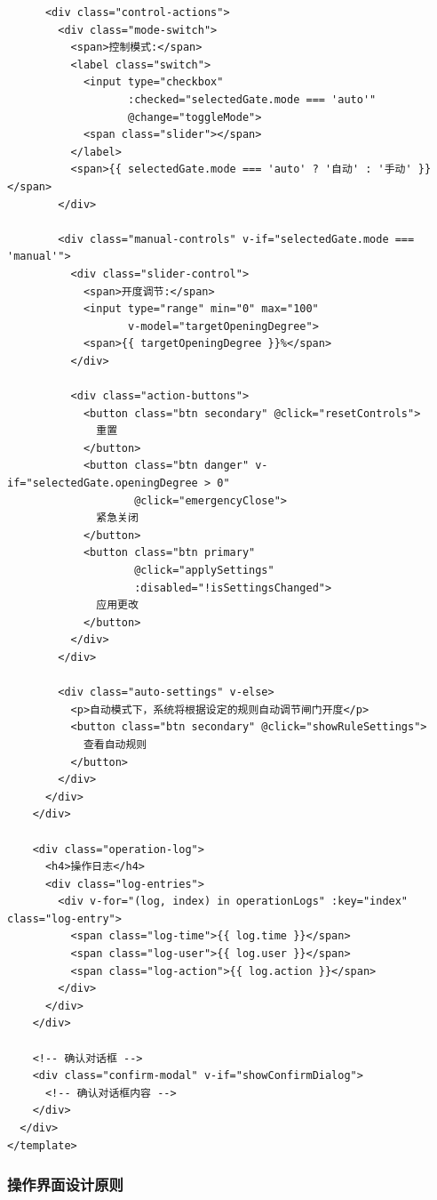 \begin{lstlisting}
      <div class="control-actions">
        <div class="mode-switch">
          <span>控制模式:</span>
          <label class="switch">
            <input type="checkbox" 
                   :checked="selectedGate.mode === 'auto'"
                   @change="toggleMode">
            <span class="slider"></span>
          </label>
          <span>{{ selectedGate.mode === 'auto' ? '自动' : '手动' }}</span>
        </div>
        
        <div class="manual-controls" v-if="selectedGate.mode === 'manual'">
          <div class="slider-control">
            <span>开度调节:</span>
            <input type="range" min="0" max="100" 
                   v-model="targetOpeningDegree">
            <span>{{ targetOpeningDegree }}%</span>
          </div>
          
          <div class="action-buttons">
            <button class="btn secondary" @click="resetControls">
              重置
            </button>
            <button class="btn danger" v-if="selectedGate.openingDegree > 0" 
                    @click="emergencyClose">
              紧急关闭
            </button>
            <button class="btn primary" 
                    @click="applySettings"
                    :disabled="!isSettingsChanged">
              应用更改
            </button>
          </div>
        </div>
        
        <div class="auto-settings" v-else>
          <p>自动模式下，系统将根据设定的规则自动调节闸门开度</p>
          <button class="btn secondary" @click="showRuleSettings">
            查看自动规则
          </button>
        </div>
      </div>
    </div>
    
    <div class="operation-log">
      <h4>操作日志</h4>
      <div class="log-entries">
        <div v-for="(log, index) in operationLogs" :key="index" class="log-entry">
          <span class="log-time">{{ log.time }}</span>
          <span class="log-user">{{ log.user }}</span>
          <span class="log-action">{{ log.action }}</span>
        </div>
      </div>
    </div>
    
    <!-- 确认对话框 -->
    <div class="confirm-modal" v-if="showConfirmDialog">
      <!-- 确认对话框内容 -->
    </div>
  </div>
</template>
\end{lstlisting}

\subsubsection{操作界面设计原则}\label{ux64cdux4f5cux754cux9762ux8bbeux8ba1ux539fux5219}

